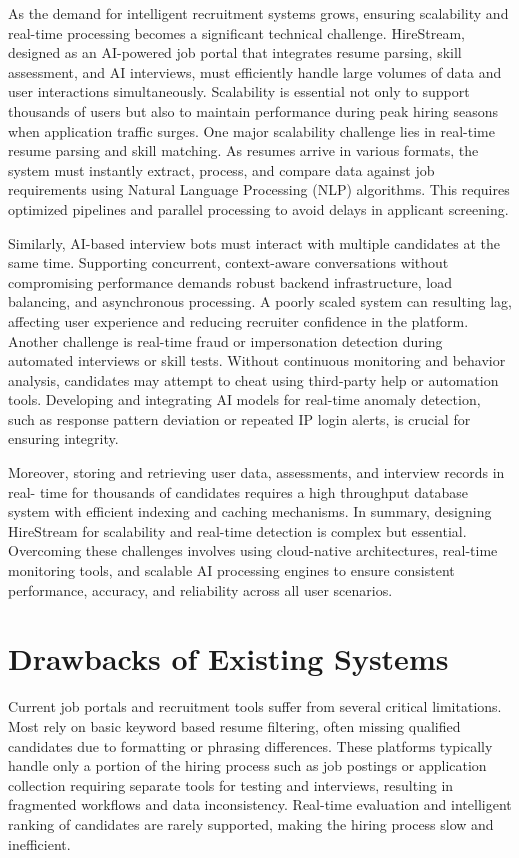 \documentclass[a4paper, 12pt]{report}
\begin{document}
As the demand for intelligent recruitment systems grows, ensuring scalability and real-time processing becomes a significant technical challenge. HireStream, designed as an AI-powered job portal that integrates resume parsing, skill assessment, and AI interviews, must efficiently handle large volumes of data and user interactions simultaneously. Scalability is essential not only to support thousands of users but also to maintain performance during peak hiring seasons when application traffic surges.
One major scalability challenge lies in real-time resume parsing and skill matching. As resumes arrive in various formats, the system must instantly extract, process, and compare data against job requirements using Natural Language Processing (NLP) algorithms. This requires optimized pipelines and parallel processing to avoid delays in applicant screening.
 
Similarly, AI-based interview bots must interact with multiple candidates at the same time. Supporting concurrent, context-aware conversations without compromising performance demands robust backend infrastructure, load balancing, and asynchronous processing. A poorly scaled system can resulting lag, affecting user experience and reducing recruiter confidence in the platform.
Another challenge is real-time fraud or impersonation detection during automated interviews or skill tests. Without continuous monitoring and behavior analysis, candidates may attempt to cheat using third-party help or automation tools. Developing and integrating AI models for real-time anomaly detection, such as response pattern deviation or repeated IP login alerts, is crucial for ensuring integrity.

Moreover, storing and retrieving user data, assessments, and interview records in real- time for thousands of candidates requires a high throughput database system with efficient indexing and caching mechanisms. In summary, designing HireStream for scalability and real-time detection is complex but essential. Overcoming these challenges involves using cloud-native architectures, real-time monitoring tools, and scalable AI processing engines to ensure consistent performance, accuracy, and reliability across all user scenarios.


\section{Drawbacks of Existing Systems}
Current job portals and recruitment tools suffer from several critical limitations. Most rely on basic keyword based resume filtering, often missing qualified candidates due to formatting or phrasing differences. These platforms typically handle only a portion of the hiring process such as job postings or application collection requiring separate tools for testing and interviews, resulting in fragmented workflows and data inconsistency. Real-time evaluation and intelligent ranking of candidates are rarely supported, making the hiring process slow and inefficient.
\end{document}
